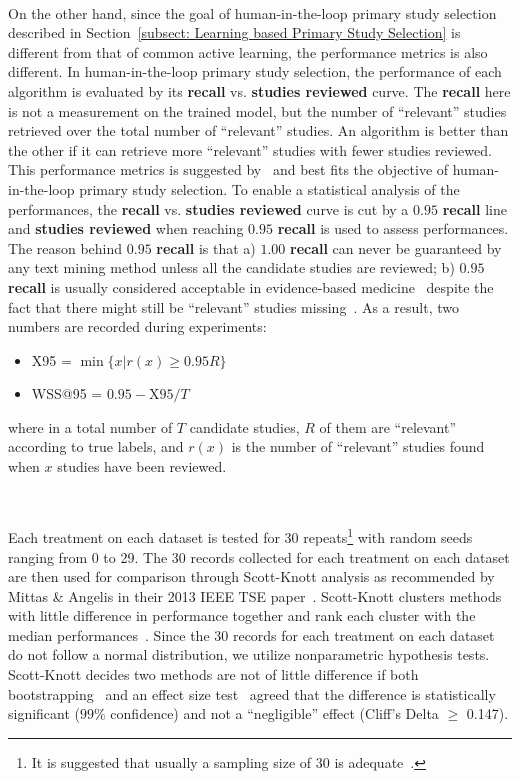 \documentclass{svjour3}
\theoremstyle{break}
\newcommand{\respto}[1]{
\fcolorbox{black}{black!15}{
\label{response:#1}
\bf
  \scriptsize R-{#1}}~
}
\begin{document}
\respto{1b1}
On the other hand, since the goal of human-in-the-loop primary study selection described in Section~\ref{subsect: Learning based Primary Study Selection} is different from that of common active learning, the performance metrics is also different. In human-in-the-loop primary study selection, the performance of each algorithm is evaluated by its \textbf{recall} vs. \textbf{studies reviewed} curve. The \textbf{recall} here is not a measurement on the trained model, but the number of ``relevant'' studies retrieved over the total number of ``relevant'' studies. An algorithm is better than the other if it can retrieve more ``relevant'' studies with fewer studies reviewed. This performance metrics is suggested by~\cite{cormack2015autonomy,cormack2014evaluation,tredennick2015} and best fits the objective of human-in-the-loop primary study selection. To enable a statistical analysis of the performances, the \textbf{recall} vs. \textbf{studies reviewed} curve is cut by a $0.95$ \textbf{recall} line and \textbf{studies reviewed} when reaching $0.95$ \textbf{recall} is used to assess performances. The reason behind $0.95$ \textbf{recall} is that a) $1.00$ \textbf{recall} can never be guaranteed by any text mining method unless all the candidate studies are reviewed; b) $0.95$ \textbf{recall} is usually considered acceptable in evidence-based medicine~\cite{cohen2011performance,cohen2006reducing,o2015using} despite the fact that there might still be ``relevant'' studies missing~\cite{shemilt2016use}. As a result, two numbers are recorded during experiments:
\begin{itemize}
\item
X95 = $\min \{x | r(x)\geq0.95 R\}$
\item
WSS@95 = $0.95-\text{X95}/T$
\end{itemize}
where in a total number of $T$ candidate studies, $R$ of them are ``relevant'' according to true labels, and $r(x)$ is the number of ``relevant'' studies found when $x$ studies have been reviewed.

\respto{1e2}
Each treatment on each dataset is tested for 30 repeats\footnote{It is suggested that usually a sampling size of $30$ is adequate~\cite{isotalo2001basics}.} with random seeds ranging from 0 to 29. The 30 records collected for each treatment on each dataset are then used for comparison through Scott-Knott analysis as recommended by Mittas \& Angelis in their 2013 IEEE TSE paper~\cite{mittas2013ranking}. Scott-Knott clusters methods with little difference in performance together and rank each cluster with the median performances~\cite{scott1974cluster}. Since the 30 records for each treatment on each dataset do not follow a normal distribution, we utilize nonparametric hypothesis tests. Scott-Knott decides two methods are not of little difference if both bootstrapping~\cite{efron1982jackknife} and an effect size test~\cite{cliff1993dominance} agreed that the difference is statistically significant ($99\%$
confidence) and not a “negligible” effect (Cliff's Delta $\ge$ 0.147).
\end{document}
